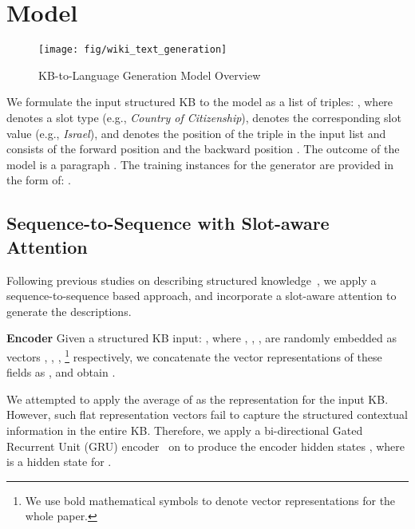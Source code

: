 \documentclass[11pt,a4paper]{article}
\begin{document}
 \section{Model}







\begin{figure*}[!htb]
\centering\small
\texttt{[image: fig/wiki\_text\_generation]}
\caption{KB-to-Language Generation Model Overview}
\label{fig:overview}
\vspace{-2mm}
\end{figure*}












We formulate the input structured KB to the model as a list of triples: 
, where 
 denotes a slot type (e.g., \emph{Country of Citizenship}),  denotes the corresponding slot value (e.g., \emph{Israel}), and  denotes the position of the triple in the input list
and consists of the forward position  and the backward position . The outcome of the model is a paragraph .
The training instances for the generator are provided in the form of: . 






\subsection{Sequence-to-Sequence with Slot-aware Attention}
\label{sec:slot-att}
Following previous studies on describing structured knowledge~\cite{biogen16,sha2017order,table2text17}, we apply a sequence-to-sequence based approach, and incorporate a slot-aware attention to generate the descriptions.

\textbf{Encoder} Given a structured KB input: , where , , ,  are randomly embedded as vectors , , , \footnote{We use bold mathematical symbols to denote vector representations for the whole paper.} respectively, we concatenate the vector representations of these fields as , and obtain .

We attempted to apply the average of  as the representation for the input KB. However, such flat representation vectors fail to capture the structured contextual information in the entire KB. Therefore, we apply a bi-directional Gated Recurrent Unit (GRU) encoder~\citep{cho2014learning} on  to produce the encoder hidden states , where  is a hidden state for . 
\end{document}
